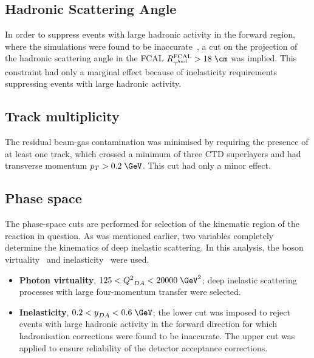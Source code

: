 \subsection{Hadronic Scattering Angle}
\label{subsec:gammahadcut}
In order to suppress events with large hadronic activity in the forward region, where the simulations were found to be inaccurate~\cite{thesis:jose:2003}, a cut on the projection of the hadronic scattering angle in the FCAL $R^\text{FCAL}_{\gamma^{had}} > 18\;\cm$ was implied. This constraint had only a marginal effect because of inelasticity requirements suppressing events with large hadronic activity.

\subsection{Track multiplicity}
\label{subsec:trackmultcut}
The residual beam-gas contamination was minimised by requiring the presence of at least one track, which crossed a minimum of three CTD superlayers and had transverse momentum $p_T>0.2\;\GeV$. This cut had only a minor effect.

\subsection{Phase space}
\label{subsec:phasespace}
The phase-space cuts are performed for selection of the kinematic region of the reaction in question. As was mentioned earlier, two variables completely determine the kinematics of deep inelastic scattering. In this analysis, the boson virtuality \qsq~and inelasticity \y~were used.
\begin{itemize}
	\item \textbf{Photon virtuality}, $125 < \qsq_{DA} < 20000\;\GeV^2$;  deep inelastic scattering processes with large four-momentum transfer were selected.
	\item \textbf{Inelasticity}, $0.2 < \y_{DA} < 0.6\;\GeV$; the lower cut was imposed to reject events with large hadronic activity in the forward direction for which hadronisation corrections were found to be inaccurate. The upper cut was applied to ensure reliability of the detector acceptance corrections.
\end{itemize}

